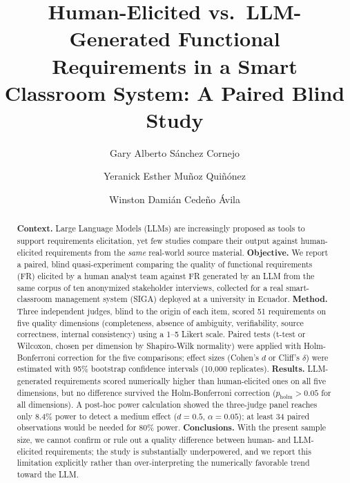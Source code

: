 \documentclass{llncs}
\begin{document}
\title{Human-Elicited vs.\ LLM-Generated Functional Requirements in a Smart Classroom System: A Paired Blind Study}

\author{Gary Alberto S\'anchez Cornejo \and
Yeranick Esther Mu\~noz Qui\~n\'onez \and
Winston Dami\'an Cede\~no \'Avila}


\maketitle

\begin{abstract}
\textbf{Context.} Large Language Models (LLMs) are increasingly proposed as tools to
support requirements elicitation, yet few studies compare their output against
human-elicited requirements from the \emph{same} real-world source material.
\textbf{Objective.} We report a paired, blind quasi-experiment comparing the quality
of functional requirements (FR) elicited by a human analyst team against FR generated
by an LLM from the same corpus of ten anonymized stakeholder interviews, collected for
a real smart-classroom management system (SIGA) deployed at a university in Ecuador.
\textbf{Method.} Three independent judges, blind to the origin of each item, scored 51
requirements on five quality dimensions (completeness, absence of ambiguity,
verifiability, source correctness, internal consistency) using a 1--5 Likert scale.
Paired tests (t-test or Wilcoxon, chosen per dimension by Shapiro-Wilk normality) were
applied with Holm-Bonferroni correction for the five comparisons; effect sizes (Cohen's
$d$ or Cliff's $\delta$) were estimated with 95\% bootstrap confidence intervals
(10{,}000 replicates).
\textbf{Results.} LLM-generated requirements scored numerically higher than
human-elicited ones on all five dimensions, but no difference survived the Holm-Bonferroni
correction ($p_{\text{holm}} > 0.05$ for all dimensions). A post-hoc power calculation
showed the three-judge panel reaches only 8.4\% power to detect a medium effect
($d=0.5$, $\alpha=0.05$); at least 34 paired observations would be needed for 80\% power.
\textbf{Conclusions.} With the present sample size, we cannot confirm or rule out a
quality difference between human- and LLM-elicited requirements; the study is
substantially underpowered, and we report this limitation explicitly rather than
over-interpreting the numerically favorable trend toward the LLM.
\end{abstract}
\end{document}
